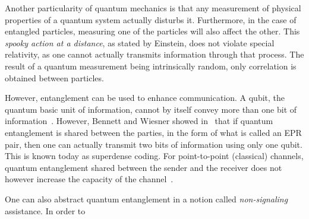 Another particularity of quantum mechanics is that any measurement of physical properties of a quantum system actually disturbs it. Furthermore, in the case of entangled particles, measuring one of the particles will also affect the other. This \emph{spooky action at a distance}, as stated by Einstein, does not violate special relativity, as one cannot actually transmits information through that process. The result of a quantum measurement being intrinsically random, only correlation is obtained between particles.

However, entanglement can be used to enhance communication. A qubit, the quantum basic unit of information, cannot by itself convey more than one bit of information~\cite{Holevo73}. However, Bennett and Wiesner showed in~\cite{BW92} that if quantum entanglement is shared between the parties, in the form of what is called an EPR pair, then one can actually transmit two bits of information using only one qubit. This is known today as superdense coding. For point-to-point (classical) channels, quantum entanglement shared between the sender and the receiver does not however increase the capacity of the channel~\cite{BSST99}.

One can also abstract quantum entanglement in a notion called \emph{non-signaling} assistance. In order to 




